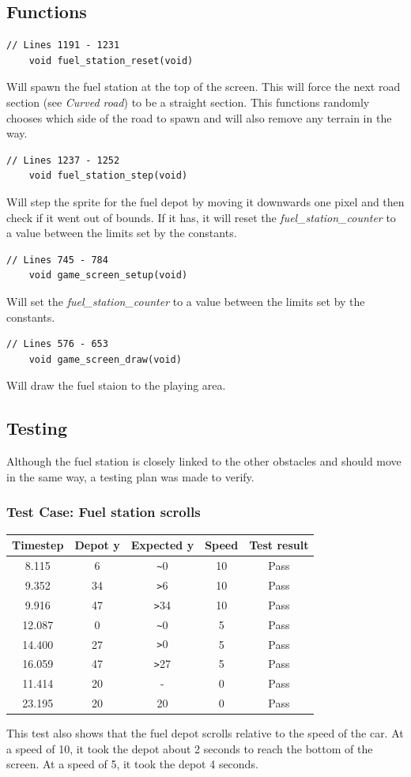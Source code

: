 \documentclass{article}
\begin{document}
\subsection*{Functions}
\begin{lstlisting}[style=CStyle]
	// Lines 1191 - 1231
	void fuel_station_reset(void)
\end{lstlisting}
Will spawn the fuel station at the top of the screen. This will force the next road section (see \emph{Curved road}) to be a straight section. This functions randomly chooses which side of the road to spawn and will also remove any terrain in the way.
\begin{lstlisting}[style=CStyle]
	// Lines 1237 - 1252
	void fuel_station_step(void)
\end{lstlisting}
Will step the sprite for the fuel depot by moving it downwards one pixel and then check if it went out of bounds. If it has, it will reset the \emph{fuel\_station\_counter} to a value between the limits set by the constants.
\begin{lstlisting}[style=CStyle]
	// Lines 745 - 784
	void game_screen_setup(void)
\end{lstlisting}
Will set the \emph{fuel\_station\_counter} to a value between the limits set by the constants. 
\begin{lstlisting}[style=CStyle]
	// Lines 576 - 653
	void game_screen_draw(void)
\end{lstlisting}
Will draw the fuel staion to the playing area. 
\newpage

\subsection*{Testing}
Although the fuel station is closely linked to the other obstacles and should move in the same way, a testing plan was made to verify. 
\subsubsection*{Test Case: Fuel station scrolls}
\begin{center}
\begin{tabular}{ c c c c c }
Timestep	& Depot y	& Expected y 	& Speed	& Test result		\\ \hline
8.115		& 6		& \verb|~|0		& 10		& Pass		\\
9.352		& 34		& \verb|>|6		& 10		& Pass		\\
9.916		& 47		& \verb|>|34	& 10		& Pass		\\
12.087	& 0		& \verb|~|0		& 5		& Pass		\\
14.400	& 27		& \verb|>|0		& 5		& Pass		\\
16.059	& 47		& \verb|>|27	& 5		& Pass		\\
11.414	& 20		& - 			& 0		& Pass		\\
23.195	& 20		& 20			& 0		& Pass		\\ \hline
\end{tabular}
\end{center}
This test also shows that the fuel depot scrolls relative to the speed of the car. At a speed of 10, it took the depot about 2 seconds to reach the bottom of the screen. At a speed of 5, it took the depot 4 seconds.
\clearpage
\end{document}
